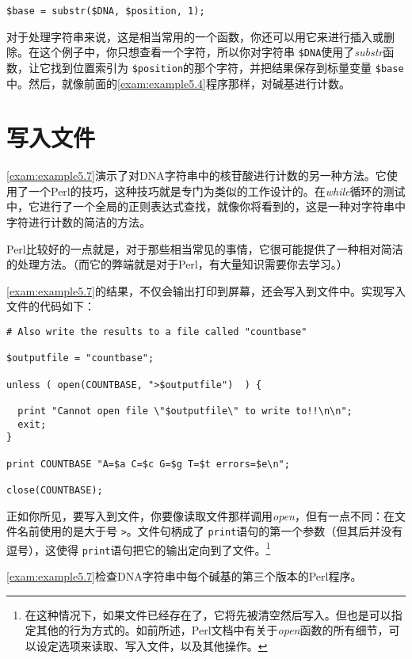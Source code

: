 \begin{lstlisting}
$base = substr($DNA, $position, 1);
\end{lstlisting}

对于处理字符串来说，这是相当常用的一个函数，你还可以用它来进行插入或删除。在这个例子中，你只想查看一个字符，所以你对字符串 \verb|$DNA|使用了\textit{substr}函数，让它找到位置索引为 \verb|$position|的那个字符，并把结果保存到标量变量 \verb|$base|中。然后，就像前面的\autoref{exam:example5.4}程序那样，对碱基进行计数。

\section{写入文件}
  \autoref{exam:example5.7}演示了对DNA字符串中的核苷酸进行计数的另一种方法。它使用了一个Perl的技巧，这种技巧就是专门为类似的工作设计的。在\textit{while}循环的测试中，它进行了一个全局的正则表达式查找，就像你将看到的，这是一种对字符串中字符进行计数的简洁的方法。

Perl比较好的一点就是，对于那些相当常见的事情，它很可能提供了一种相对简洁的处理方法。（而它的弊端就是对于Perl，有大量知识需要你去学习。）

\autoref{exam:example5.7}的结果，不仅会输出打印到屏幕，还会写入到文件中。实现写入文件的代码如下：

\begin{lstlisting}
# Also write the results to a file called "countbase"

$outputfile = "countbase";

unless ( open(COUNTBASE, ">$outputfile")  ) {

  print "Cannot open file \"$outputfile\" to write to!!\n\n";
  exit;
}

print COUNTBASE "A=$a C=$c G=$g T=$t errors=$e\n";

close(COUNTBASE);
\end{lstlisting}

正如你所见，要写入到文件，你要像读取文件那样调用\textit{open}，但有一点不同：在文件名前使用的是大于号 \verb|>|。文件句柄成了 \verb|print|语句的第一个参数（但其后并没有逗号），这使得 \verb|print|语句把它的输出定向到了文件。\footnote{在这种情况下，如果文件已经存在了，它将先被清空然后写入。但也是可以指定其他的行为方式的。如前所述，Perl文档中有关于\textit{open}函数的所有细节，可以设定选项来读取、写入文件，以及其他操作。}

\autoref{exam:example5.7}检查DNA字符串中每个碱基的第三个版本的Perl程序。



